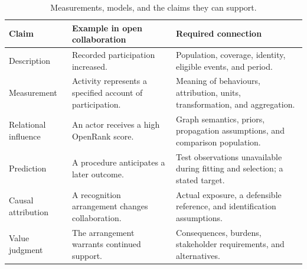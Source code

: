 \begin{table}[tbp]
\caption{Measurements, models, and the claims they can support.}
\label{tab:claims}
\begingroup\fontsize{9.2}{11.8}\selectfont
\renewcommand{\arraystretch}{1.12}
\begin{tabularx}{\textwidth}{@{}>{\raggedright\arraybackslash}p{25mm}>{\raggedright\arraybackslash}X>{\raggedright\arraybackslash}X@{}}
\toprule
\textbf{Claim} & \textbf{Example in open collaboration} & \textbf{Required connection}\\
\midrule
Description & Recorded participation increased. & Population, coverage, identity, eligible events, and period.\\[5pt]
Measurement & Activity represents a specified account of participation. & Meaning of behaviours, attribution, units, transformation, and aggregation.\\[5pt]
Relational influence & An actor receives a high OpenRank score. & Graph semantics, priors, propagation assumptions, and comparison population.\\[5pt]
Prediction & A procedure anticipates a later outcome. & Test observations unavailable during fitting and selection; a stated target.\\[5pt]
Causal attribution & A recognition arrangement changes collaboration. & Actual exposure, a defensible reference, and identification assumptions.\\[5pt]
Value judgment & The arrangement warrants continued support. & Consequences, burdens, stakeholder requirements, and alternatives.\\
\bottomrule
\end{tabularx}
\endgroup
{}
\end{table}
